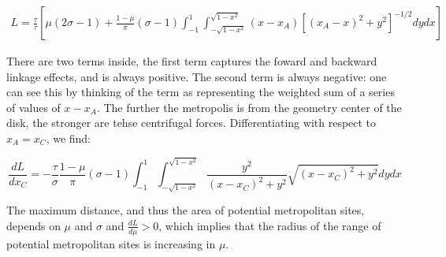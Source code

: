 \begin{eqnarray}
    L = \frac{\tau}{\tau} [\mu (2 \sigma - 1) + \frac{1 - \mu}{\pi}(\sigma - 1) \int_{-1}^1 \int_{-\sqrt{1 - x^2}}^{\sqrt{1 - x^2}}(x - x_A)[(x_A - x)^2 + y^2]^{-1/2}dy dx]
\end{eqnarray}

There are two terms inside, the first term captures the foward and backward linkage effects, and is always positive. The second term is always negative: one can see this by thinking of the term as representing the weighted sum of a series of values of $x - x_A$. The further the metropolis is from the geometry center of the disk, the stronger are tehse centrifugal forces. Differentiating with respect to $x_A = x_C$, we find:

\begin{equation}
    \frac{dL}{dx_C} = -\frac{\tau}{\sigma} \frac{1 - \mu}{\pi} (\sigma - 1) \int_{-1}^1 \int_{-\sqrt{1 - x^2}}^{\sqrt{1 - x^2}} \frac{y^2}{(x - x_C)^2 + y^2} \sqrt{(x - x_C)^2 + y^2}dy dx
\end{equation}

The maximum distance, and thus the area of potential metropolitan sites, depends on $\mu$ and $\sigma$ and $\frac{dL}{d\mu} > 0$, which implies that the radius of the range of potential metropolitan sites is increasing in $\mu$.